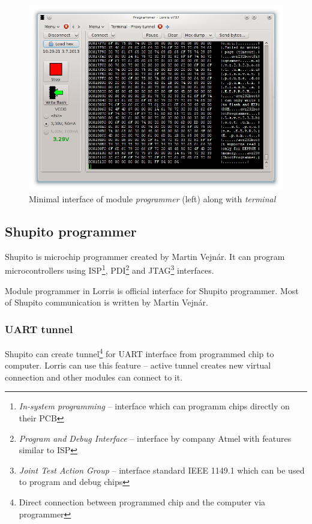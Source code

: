 \documentclass[12pt, a4paper, oneside]{article}
\newcommand{\It}{\textit}  %
\begin{document}
\begin{figure}[H]
\begin{center}
\includegraphics[width=\textwidth]{img/programmer_mini.png}
\caption{Minimal interface of module \It{programmer} (left) along with \It{terminal}}
\label{prog_mini}
\end{center}
\end{figure}

\subsection{Shupito programmer}
Shupito is microchip programmer created by Martin Vejnár. It can program microcontrollers using ISP\footnote{\It{In-system programming} -- interface which can programm chips directly on their PCB}, PDI\footnote{\It{Program and Debug Interface} -- interface by company Atmel with features similar to ISP} and JTAG\footnote{\It{Joint Test Action Group} -- interface standard IEEE 1149.1 which can be used to program and debug chips} interfaces.

Module programmer in Lorris is official interface for Shupito programmer. Most of Shupito communication is written by Martin Vejnár.

\subsubsection{UART tunnel}
\label{tunel}
Shupito can create tunnel\footnote{Direct connection between programmed chip and the computer via programmer} for UART interface from programmed chip to computer. Lorris can use this feature -- active tunnel creates new virtual connection and other modules can connect to it.
\end{document}
